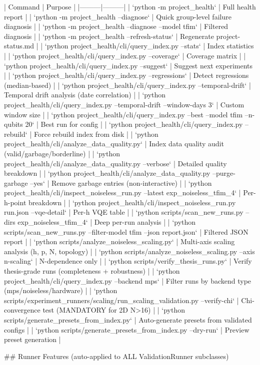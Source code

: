 | Command | Purpose |
|---------|---------|
| `python -m project_health` | Full health report |
| `python -m project_health --diagnose` | Quick group-level failure diagnosis |
| `python -m project_health --diagnose --model tfim` | Filtered diagnosis |
| `python -m project_health --refresh-status` | Regenerate project-status.md |
| `python project_health/cli/query_index.py --stats` | Index statistics |
| `python project_health/cli/query_index.py --coverage` | Coverage matrix |
| `python project_health/cli/query_index.py --suggest` | Suggest next experiments |
| `python project_health/cli/query_index.py --regressions` | Detect regressions (median-based) |
| `python project_health/cli/query_index.py --temporal-drift` | Temporal drift analysis (date correlation) |
| `python project_health/cli/query_index.py --temporal-drift --window-days 3` | Custom window size |
| `python project_health/cli/query_index.py --best --model tfim --n-qubits 20` | Best run for config |
| `python project_health/cli/query_index.py --rebuild` | Force rebuild index from disk |
| `python project_health/cli/analyze_data_quality.py` | Index data quality audit (valid/garbage/borderline) |
| `python project_health/cli/analyze_data_quality.py --verbose` | Detailed quality breakdown |
| `python project_health/cli/analyze_data_quality.py --purge-garbage --yes` | Remove garbage entries (non-interactive) |
| `python project_health/cli/inspect_noiseless_run.py --latest exp_noiseless_tfim_4` | Per-h-point breakdown |
| `python project_health/cli/inspect_noiseless_run.py run.json --vqe-detail` | Per-h VQE table |
| `python scripts/scan_new_runs.py --dirs exp_noiseless_tfim_4` | Deep per-run analysis |
| `python scripts/scan_new_runs.py --filter-model tfim --json report.json` | Filtered JSON report |
| `python scripts/analyze_noiseless_scaling.py` | Multi-axis scaling analysis (h, p, N, topology) |
| `python scripts/analyze_noiseless_scaling.py --axis n-scaling` | N-dependence only |
| `python scripts/verify_thesis_runs.py` | Verify thesis-grade runs (completeness + robustness) |
| `python project_health/cli/query_index.py --backend mps` | Filter runs by backend type (mps/noiseless/hardware) |
| `python scripts/experiment_runners/scaling/run_scaling_validation.py --verify-chi` | Chi-convergence test (MANDATORY for 2D N>16) |
| `python scripts/generate_presets_from_index.py` | Auto-generate presets from validated configs |
| `python scripts/generate_presets_from_index.py --dry-run` | Preview preset generation |

## Runner Features (auto-applied to ALL ValidationRunner subclasses)

